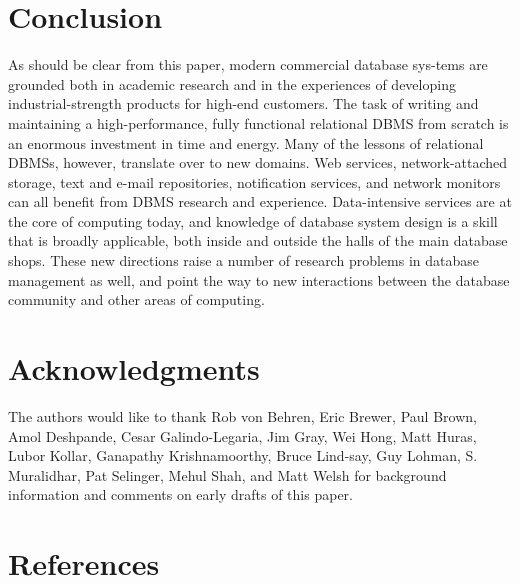 \documentclass[a4paper,11pt,twoside,openright]{book}
\begin{document}
\hypertarget{conclusion}{%
\chapter{Conclusion}\label{conclusion}}

As should be clear from this paper, modern commercial database sys-tems
are grounded both in academic research and in the experiences of
developing industrial-strength products for high-end customers. The task
of writing and maintaining a high-performance, fully functional
relational DBMS from scratch is an enormous investment in time and
energy. Many of the lessons of relational DBMSs, however, translate over
to new domains. Web services, network-attached storage, text and e-mail
repositories, notification services, and network monitors can all
benefit from DBMS research and experience. Data-intensive services are
at the core of computing today, and knowledge of database system design
is a skill that is broadly applicable, both inside and outside the halls
of the main database shops. These new directions raise a number of
research problems in database management as well, and point the way to
new interactions between the database community and other areas of
computing.

\hypertarget{acknowledgments}{%
\chapter*{Acknowledgments}\label{acknowledgments}}

The authors would like to thank Rob von Behren, Eric Brewer, Paul Brown,
Amol Deshpande, Cesar Galindo-Legaria, Jim Gray, Wei Hong, Matt Huras,
Lubor Kollar, Ganapathy Krishnamoorthy, Bruce Lind-say, Guy Lohman, S.
Muralidhar, Pat Selinger, Mehul Shah, and Matt Welsh for background
information and comments on early drafts of this paper.

\hypertarget{references}{%
\chapter*{References}\label{references}}
\end{document}
